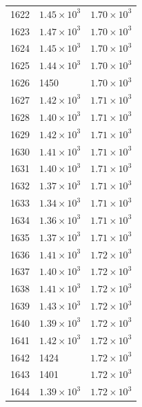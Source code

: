 \begin{table}[H]
\begin{tabular}{lll}
1622 & $\displaystyle 1.45 \times 10^{3}$ & $\displaystyle 1.70 \times 10^{3}$ \\
1623 & $\displaystyle 1.47 \times 10^{3}$ & $\displaystyle 1.70 \times 10^{3}$ \\
1624 & $\displaystyle 1.45 \times 10^{3}$ & $\displaystyle 1.70 \times 10^{3}$ \\
1625 & $\displaystyle 1.44 \times 10^{3}$ & $\displaystyle 1.70 \times 10^{3}$ \\
1626 & 1450 & $\displaystyle 1.70 \times 10^{3}$ \\
1627 & $\displaystyle 1.42 \times 10^{3}$ & $\displaystyle 1.71 \times 10^{3}$ \\
1628 & $\displaystyle 1.40 \times 10^{3}$ & $\displaystyle 1.71 \times 10^{3}$ \\
1629 & $\displaystyle 1.42 \times 10^{3}$ & $\displaystyle 1.71 \times 10^{3}$ \\
1630 & $\displaystyle 1.41 \times 10^{3}$ & $\displaystyle 1.71 \times 10^{3}$ \\
1631 & $\displaystyle 1.40 \times 10^{3}$ & $\displaystyle 1.71 \times 10^{3}$ \\
1632 & $\displaystyle 1.37 \times 10^{3}$ & $\displaystyle 1.71 \times 10^{3}$ \\
1633 & $\displaystyle 1.34 \times 10^{3}$ & $\displaystyle 1.71 \times 10^{3}$ \\
1634 & $\displaystyle 1.36 \times 10^{3}$ & $\displaystyle 1.71 \times 10^{3}$ \\
1635 & $\displaystyle 1.37 \times 10^{3}$ & $\displaystyle 1.71 \times 10^{3}$ \\
1636 & $\displaystyle 1.41 \times 10^{3}$ & $\displaystyle 1.72 \times 10^{3}$ \\
1637 & $\displaystyle 1.40 \times 10^{3}$ & $\displaystyle 1.72 \times 10^{3}$ \\
1638 & $\displaystyle 1.41 \times 10^{3}$ & $\displaystyle 1.72 \times 10^{3}$ \\
1639 & $\displaystyle 1.43 \times 10^{3}$ & $\displaystyle 1.72 \times 10^{3}$ \\
1640 & $\displaystyle 1.39 \times 10^{3}$ & $\displaystyle 1.72 \times 10^{3}$ \\
1641 & $\displaystyle 1.42 \times 10^{3}$ & $\displaystyle 1.72 \times 10^{3}$ \\
1642 & 1424 & $\displaystyle 1.72 \times 10^{3}$ \\
1643 & 1401 & $\displaystyle 1.72 \times 10^{3}$ \\
1644 & $\displaystyle 1.39 \times 10^{3}$ & $\displaystyle 1.72 \times 10^{3}$ \\

\end{tabular}
\end{table}

